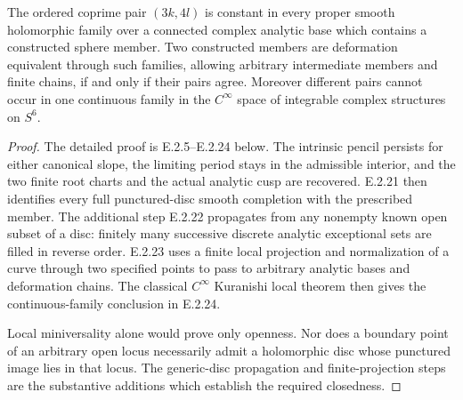 \begin{corollary}
The ordered coprime pair $(3k,4l)$ is constant in every
proper smooth holomorphic family over a connected complex
analytic base which contains a constructed sphere member.
Two constructed members are deformation equivalent through
such families, allowing arbitrary intermediate members and
finite chains, if and only if their pairs agree.
Moreover different pairs cannot occur in one continuous
family in the $C^\infty$ space of integrable complex
structures on $S^6$.
\end{corollary}
\begin{proof}
The detailed proof is E.2.5--E.2.24 below.  The intrinsic
pencil persists for either canonical slope, the limiting
period stays in the admissible interior, and the two finite
root charts and the actual analytic cusp are recovered.
E.2.21 then identifies every full punctured-disc smooth
completion with the prescribed member.  The additional
step E.2.22 propagates from any nonempty known open subset
of a disc: finitely many successive discrete analytic
exceptional sets are filled in reverse order.  E.2.23 uses
a finite local projection and normalization of a curve
through two specified points to pass to arbitrary analytic
bases and deformation chains.
The classical $C^\infty$ Kuranishi local theorem then
gives the continuous-family conclusion in E.2.24.

Local miniversality alone would prove only openness.
Nor does a boundary point of an arbitrary open locus
necessarily admit a holomorphic disc whose punctured
image lies in that locus.  The generic-disc propagation
and finite-projection steps are the substantive additions
which establish the required closedness.
\end{proof}




















